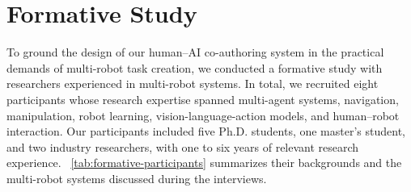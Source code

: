 
\section{Formative Study}
\label{sec:formative-study}

To ground the design of our human--AI co-authoring system in the practical demands of multi-robot task creation, we conducted a formative study with researchers experienced in multi-robot systems. 
In total, we recruited eight participants whose research expertise spanned multi-agent systems, navigation, manipulation, robot learning,  vision-language-action models, and human--robot interaction.
Our participants included five Ph.D. students, one master's student, and two industry researchers, with one to six years of relevant research experience.
~\autoref{tab:formative-participants} summarizes their backgrounds and the multi-robot systems discussed during the interviews.

